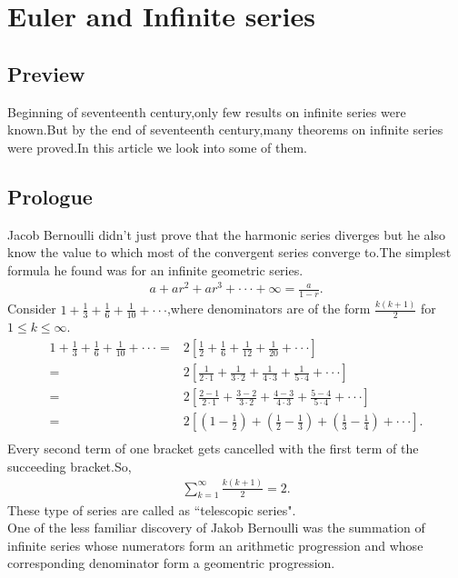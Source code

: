 \documentclass[a4paper,reqno,11pt]{book}
\theoremstyle{plain}%
\theoremstyle{definition}
\begin{document}
\chapter{Euler and Infinite series}
\section{Preview}
\noindent Beginning of seventeenth century,only few results on infinite series were known.But by the end of seventeenth century,many theorems on infinite series were proved.In this article we look into some of them.
\section{Prologue}
Jacob Bernoulli didn't just prove that the harmonic series diverges but he also know the value to which most of the convergent series converge to.The simplest formula he found was for an infinite geometric series.
\begin{eqnarray*}
    a+ar^2+ar^3+\cdot\cdot\cdot+\infty=\frac{a}{1-r}.
\end{eqnarray*}
Consider $1+\frac{1}{3}+\frac{1}{6}+\frac{1}{10}+\cdot\cdot\cdot$,where denominators are of the form $\frac{k(k+1)}{2}$ for $1\leq k\leq\infty$.
\begin{align*}
    1+\frac{1}{3}+\frac{1}{6}+\frac{1}{10}+\cdot\cdot\cdot=&2\left[\frac{1}{2}+\frac{1}{6}+\frac{1}{12}+\frac{1}{20}+\cdot\cdot\cdot\right]\\
    =&2\left[\frac{1}{2\cdot1}+\frac{1}{3\cdot2}+\frac{1}{4\cdot3}+\frac{1}{5\cdot4}+\cdot\cdot\cdot\right]\\
    =&2\left[\frac{2-1}{2\cdot1}+\frac{3-2}{3\cdot2}+\frac{4-3}{4\cdot3}+\frac{5-4}{5\cdot4}+\cdot\cdot\cdot\right]\\
    =&2\left[(1-\frac{1}{2})+(\frac{1}{2}-\frac{1}{3})+(\frac{1}{3}-\frac{1}{4})+\cdot\cdot\cdot\right].\\
\end{align*}
Every second term of one bracket gets cancelled with the first term of the succeeding bracket.So,
\begin{eqnarray*}
    \sum_{k=1}^{\infty}\frac{k(k+1)}{2}=2.
\end{eqnarray*}
These type of series are called as ``telescopic series".\\
One of the less familiar discovery of Jakob Bernoulli was the summation of infinite series whose numerators form an arithmetic progression and whose corresponding denominator form a geomentric progression.
\end{document}
